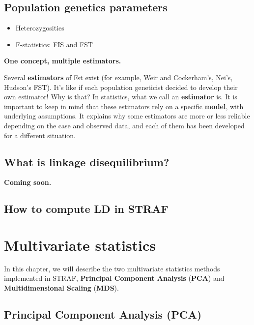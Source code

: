 \documentclass[
]{book}
\begin{document}
\hypertarget{population-genetics-parameters}{%
\section{Population genetics parameters}\label{population-genetics-parameters}}

\begin{itemize}
\item
  Heterozygosities
\item
  F-statistics: FIS and FST
\end{itemize}

\textbf{One concept, multiple estimators.}

Several \textbf{estimators} of Fst exist (for example, Weir and Cockerham's, Nei's,
Hudson's FST). It's like if each population geneticist decided to develop their
own estimator! Why is that? In statistics, what we call an \textbf{estimator}
is. It is important to keep in mind that these estimators rely on a specific \textbf{model},
with underlying assumptions. It explains why some estimators are more or less reliable
depending on the case and observed data, and each of them has been developed for
a different situation.

\hypertarget{what-is-linkage-disequilibrium}{%
\section{What is linkage disequilibrium?}\label{what-is-linkage-disequilibrium}}

\textbf{Coming soon.}

\hypertarget{how-to-compute-ld-in-straf}{%
\section{How to compute LD in STRAF}\label{how-to-compute-ld-in-straf}}

\hypertarget{multivariate-statistics}{%
\chapter{Multivariate statistics}\label{multivariate-statistics}}

In this chapter, we will describe the two multivariate statistics methods implemented
in STRAF, \textbf{Principal Component Analysis} (\textbf{PCA}) and \textbf{Multidimensional Scaling} (\textbf{MDS}).

\hypertarget{principal-component-analysis-pca}{%
\section{Principal Component Analysis (PCA)}\label{principal-component-analysis-pca}}
\end{document}
